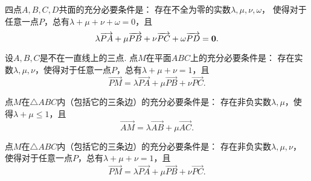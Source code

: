 \begin{theorem}\label{theorem:解析几何.四点共面的充分必要条件1}
四点\(A,B,C,D\)共面的充分必要条件是：
存在不全为零的实数\(\lambda,\mu,\nu,\omega\)，
使得对于任意一点\(P\)，总有\(\lambda+\mu+\nu+\omega=0\)，且\begin{equation*}
	\lambda \overrightarrow{PA} + \mu \overrightarrow{PB} + \nu \overrightarrow{PC} + \omega \overrightarrow{PD} = \boldsymbol{0}.
\end{equation*}
\end{theorem}

\begin{theorem}\label{theorem:解析几何.点在平面上的充分必要条件1}
设\(A,B,C\)是不在一直线上的三点.
点\(M\)在平面\(ABC\)上的充分必要条件是：
存在实数\(\lambda,\mu,\nu\)，使得对于任意一点\(P\)，总有\(\lambda+\mu+\nu=1\)，且\begin{equation*}
	\vec{PM} = \lambda \vec{PA} + \mu \vec{PB} + \nu \vec{PC}.
\end{equation*}
\end{theorem}

\begin{theorem}
点\(M\)在\(\triangle ABC\)内（包括它的三条边）的充分必要条件是：
存在非负实数\(\lambda,\mu\)，使得\(\lambda+\mu\leq1\)，且\begin{equation*}
	\vec{AM} = \lambda \vec{AB} + \mu \vec{AC}.
\end{equation*}
\end{theorem}

\begin{theorem}\label{theorem:解析几何.点在三角形上的充分必要条件2}
点\(M\)在\(\triangle ABC\)内（包括它的三条边）的充分必要条件是：
存在非负实数\(\lambda,\mu,\nu\)，使得对于任意一点\(P\)，总有\(\lambda+\mu+\nu=1\)，且\begin{equation*}
	\vec{PM} = \lambda \vec{PA} + \mu \vec{PB} + \nu \vec{PC}.
\end{equation*}
\end{theorem}
